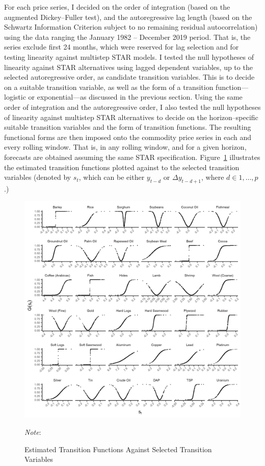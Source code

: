 \documentclass[11pt]{article}
\begin{document}
For each price series, I decided on the order of integration (based on the augmented Dickey--Fuller test), and the autoregressive lag length (based on the Schwartz Information Criterion subject to no remaining residual autocorrelation) using the data ranging the January 1982 -- December 2019 period. That is, the series exclude first 24 months, which were reserved for lag selection and for testing linearity against multistep STAR models. I tested the null hypotheses of linearity against STAR alternatives using lagged dependent variables, up to the selected autoregressive order, as candidate transition variables. This is to decide on a suitable transition variable, as well as the form of a transition function---logistic or exponential---as discussed in the previous section. Using the same order of integration and the autoregressive order, I also tested the null hypotheses of linearity against multistep STAR alternatives to decide on the horizon--specific suitable transition variables and the form of transition functions. The resulting functional forms are then imposed onto the commodity price series in each and every rolling window. That is, in any rolling window, and for a given horizon, forecasts are obtained assuming the same STAR specification. Figure~\ref{tfunc} illustrates the estimated transition functions plotted against to the selected transition variables (denoted by $s_t$, which can be either $y_{t-d}$ or $\Delta y_{t-d+1}$, where $d \in 1,\ldots,p$.) 
\begin{figure}
	\includegraphics[scale=1]{../Transition_Functions}
	\caption{Estimated Transition Functions Against Selected Transition Variables}
	\label{tfunc}
	\textit{Note}:
\end{figure}
\end{document}

